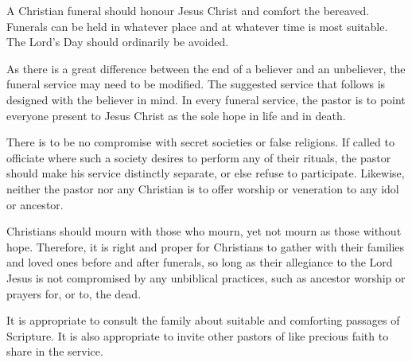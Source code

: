 \begin{outerlst}[left=0pt,labelsep=0pt]
\begin{innerlst}[resume*]
      \item A Christian funeral should honour Jesus Christ and comfort the bereaved. Funerals can be held in whatever place and at whatever time is most suitable. The Lord's Day should ordinarily be avoided. 
      \item As there is a great difference between the end of a believer and an unbeliever, the funeral service may need to be modified. The suggested service that follows is designed with the believer in mind. In every funeral service, the pastor is to point everyone present to Jesus Christ as the sole hope in life and in death. 
      \item There is to be no compromise with secret societies or false religions. If called to officiate where such a society desires to perform any of their rituals, the pastor should make his service distinctly separate, or else refuse to participate. Likewise, neither the pastor nor any Christian is to offer worship or veneration to any idol or ancestor. 
      \item Christians should mourn with those who mourn, yet not mourn as those without hope. Therefore, it is right and proper for Christians to gather with their families and loved ones before and after funerals, so long as their allegiance to the Lord Jesus is not compromised by any unbiblical practices, such as ancestor worship or prayers for, or to, the dead. 
      \item It is appropriate to consult the family about suitable and comforting passages of Scripture. It is also appropriate to invite other pastors of like precious faith to share in the service. 

\end{innerlst}
\end{outerlst}
